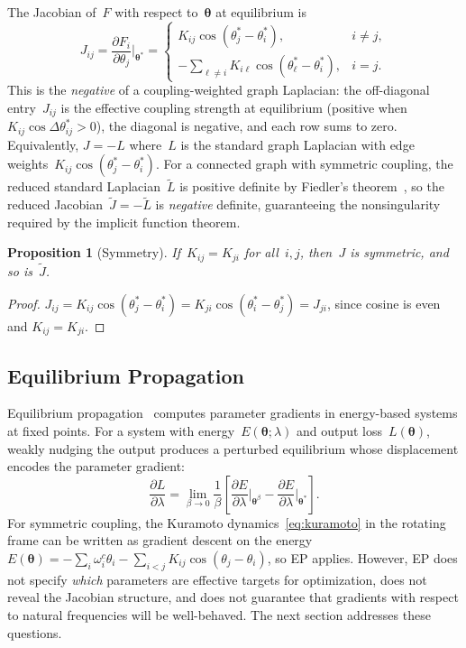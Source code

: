 \documentclass[11pt,a4paper]{article}
\newtheorem{proposition}[theorem]{Proposition}
\newcommand{\pd}[2]{\frac{\partial #1}{\partial #2}}
\newcommand{\thetastar}{\bm{\theta}^*}
\newcommand{\thetabeta}{\bm{\theta}^\beta}
\newcommand{\btheta}{\bm{\theta}}
\begin{document}
The Jacobian of~$F$ with respect to~$\btheta$ at equilibrium is
\begin{equation}
  J_{ij}
  = \pd{F_i}{\theta_j}\bigg|_{\thetastar}
  = \begin{cases}
    K_{ij} \cos(\theta_j^* - \theta_i^*), & i \neq j, \\[4pt]
    -\displaystyle\sum_{\ell \neq i} K_{i\ell}
    \cos(\theta_\ell^* - \theta_i^*), & i = j.
  \end{cases}
  \label{eq:jacobian}
\end{equation}
This is the \emph{negative} of a coupling-weighted graph Laplacian: the
off-diagonal entry~$J_{ij}$ is the effective coupling strength at
equilibrium (positive when $K_{ij}\cos\Delta\theta_{ij}^* > 0$), the
diagonal is negative, and each row sums to zero. Equivalently,
$J = -L$ where~$L$ is the standard graph Laplacian with
edge weights~$K_{ij}\cos(\theta_j^* - \theta_i^*)$. For a connected graph
with symmetric coupling, the reduced standard
Laplacian~$\tilde{L}$ is positive definite by Fiedler's
theorem~\citep{chung1997spectral}, so the reduced
Jacobian~$\tilde{J} = -\tilde{L}$ is \emph{negative} definite,
guaranteeing the nonsingularity required by the implicit function theorem.

\begin{proposition}[Symmetry]
  \label{prop:symmetry}
  If~$K_{ij} = K_{ji}$ for all~$i, j$, then~$J$ is symmetric, and so
  is~$\tilde{J}$.
\end{proposition}

\begin{proof}
  $J_{ij} = K_{ij}\cos(\theta_j^* - \theta_i^*)
  = K_{ji}\cos(\theta_i^* - \theta_j^*) = J_{ji}$, since cosine is even
  and $K_{ij} = K_{ji}$.
\end{proof}

\subsection{Equilibrium Propagation}
\label{sec:ep}

Equilibrium propagation~\citep{scellier2017equilibrium} computes parameter
gradients in energy-based systems at fixed points. For a system with
energy~$E(\btheta; \lambda)$ and output loss~$L(\btheta)$, weakly nudging
the output produces a perturbed equilibrium whose displacement encodes the
parameter gradient:
\begin{equation}
  \pd{L}{\lambda}
  = \lim_{\beta \to 0}
  \frac{1}{\beta}
  \left[
    \pd{E}{\lambda}\bigg|_{\thetabeta}
    - \pd{E}{\lambda}\bigg|_{\thetastar}
  \right].
  \label{eq:ep-general}
\end{equation}
For symmetric coupling, the Kuramoto dynamics~\eqref{eq:kuramoto} in
the rotating frame can be written as gradient descent on the energy
$E(\btheta) = -\sum_i \omega_i^c \theta_i
- \sum_{i<j} K_{ij} \cos(\theta_j - \theta_i)$, so EP applies. However,
EP does not specify \emph{which} parameters are effective targets for
optimization, does not reveal the Jacobian structure, and does not
guarantee that gradients with respect to natural frequencies will be
well-behaved. The next section addresses these questions.
\end{document}
